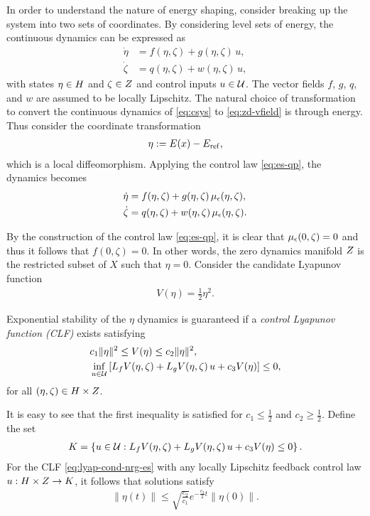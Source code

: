 \documentclass[twocolumn]{article}
\begin{document}
In order to understand the nature of energy shaping, consider breaking up the system into two sets of coordinates.
%
By considering level sets of energy, the continuous dynamics can be expressed as
\begin{align}
  \nonumber
  \dot \eta &= f(\eta, \zeta) + g(\eta, \zeta) \, u,\\
  \dot \zeta &= q(\eta, \zeta) + w(\eta, \zeta) \, u,
  \label{eq:zd-vfield}
\end{align}
%
with states $\eta \in H$ and $\zeta \in Z$ and control inputs $u \in \mathcal{U}$.
%
The vector fields $f$, $g$, $q$, and $w$ are assumed to be locally Lipschitz.
%
The natural choice of transformation to convert the continuous dynamics of \eqref{eq:csys} to \eqref{eq:zd-vfield} is through energy.
%
Thus consider the coordinate transformation
\begin{align}
  \eta := E(x) - E_{\mathrm{ref}},
\end{align}
which is a local diffeomorphism.
%
Applying the control law \eqref{eq:es-qp}, the dynamics becomes
\begin{align}
  \nonumber
  \dot \eta &= f(\eta, \zeta) + g(\eta, \zeta) \, \mu_{\epsilon}(\eta, \zeta),\\
  \dot \zeta &= q(\eta, \zeta) + w(\eta, \zeta) \, \mu_{\epsilon}(\eta, \zeta).
  \label{eq:zd-vfield-cl}
\end{align}

By the construction of the control law \eqref{eq:es-qp}, it is clear that $\mu_{\epsilon}(0, \zeta) = 0$ and thus it follows that $f(0, \zeta) = 0$.
%
In other words, the zero dynamics manifold $Z$ is the restricted subset of $X$ such that $\eta = 0$.
%
Consider the candidate Lyapunov function
\begin{align}
  V(\eta) = \frac{1}{2} \eta^{2}.
\end{align}

\begin{proposition}  
  Exponential stability of the $\eta$ dynamics is guaranteed if a {\em control Lyapunov function (CLF)} exists satisfying
  \begin{align}
    \label{eq:lyap-cond-nrg-es}
    &c_{1} \| \eta \|^{2} \leq V(\eta) \leq c_{2} \| \eta \|^2,\\
    \nonumber
    &\inf_{u \in \mathcal{U}} \left[ L_{f} V(\eta, \zeta) + L_{g} V(\eta, \zeta) \, u + c_{3} V(\eta) \right] \leq 0,
  \end{align}
  for all $(\eta, \zeta) \in H \times Z$.
\end{proposition}
It is easy to see that the first inequality is satisfied for $c_{1} \leq \frac{1}{2}$ and $c_{2} \geq \frac{1}{2}$.
%
Define the set
\begin{align}
  K = \left\{ u \in \mathcal{U} : L_{f} V(\eta, \zeta) + L_{g} V(\eta, \zeta) \, u + c_{3} V(\eta) \leq 0 \right\}.
\end{align}
For the CLF \eqref{eq:lyap-cond-nrg-es} with any locally Lipschitz feedback control law $u : H \times Z \to K$, it follows that solutions satisfy
\begin{align*}
  \| \eta(t) \| \leq \sqrt{\frac{c_{2}}{c_{1}}} e^{-\frac{c_{3}}{2} t} \| \eta(0) \|.
\end{align*}
\end{document}
